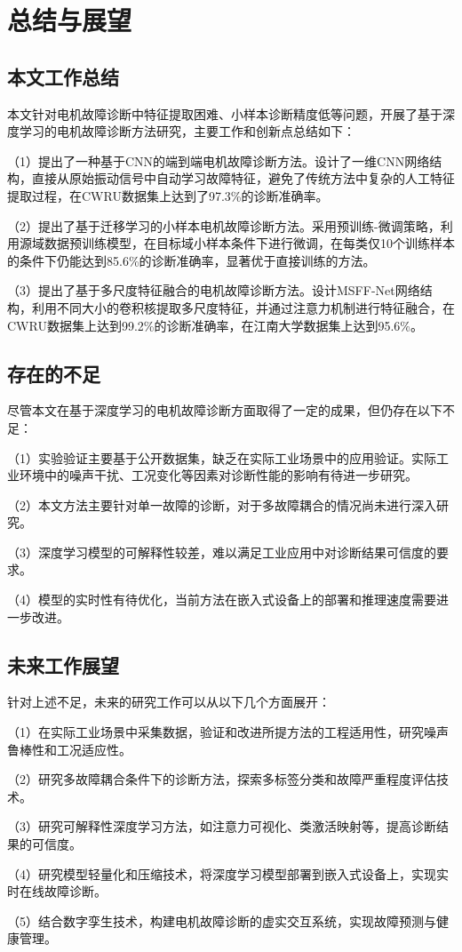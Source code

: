 \chapter{总结与展望}

\section{本文工作总结}

本文针对电机故障诊断中特征提取困难、小样本诊断精度低等问题，开展了基于深度学习的电机故障诊断方法研究，主要工作和创新点总结如下：

（1）提出了一种基于CNN的端到端电机故障诊断方法。设计了一维CNN网络结构，直接从原始振动信号中自动学习故障特征，避免了传统方法中复杂的人工特征提取过程，在CWRU数据集上达到了97.3\%的诊断准确率。

（2）提出了基于迁移学习的小样本电机故障诊断方法。采用预训练-微调策略，利用源域数据预训练模型，在目标域小样本条件下进行微调，在每类仅10个训练样本的条件下仍能达到85.6\%的诊断准确率，显著优于直接训练的方法。

（3）提出了基于多尺度特征融合的电机故障诊断方法。设计MSFF-Net网络结构，利用不同大小的卷积核提取多尺度特征，并通过注意力机制进行特征融合，在CWRU数据集上达到99.2\%的诊断准确率，在江南大学数据集上达到95.6\%。

\section{存在的不足}

尽管本文在基于深度学习的电机故障诊断方面取得了一定的成果，但仍存在以下不足：

（1）实验验证主要基于公开数据集，缺乏在实际工业场景中的应用验证。实际工业环境中的噪声干扰、工况变化等因素对诊断性能的影响有待进一步研究。

（2）本文方法主要针对单一故障的诊断，对于多故障耦合的情况尚未进行深入研究。

（3）深度学习模型的可解释性较差，难以满足工业应用中对诊断结果可信度的要求。

（4）模型的实时性有待优化，当前方法在嵌入式设备上的部署和推理速度需要进一步改进。

\section{未来工作展望}

针对上述不足，未来的研究工作可以从以下几个方面展开：

（1）在实际工业场景中采集数据，验证和改进所提方法的工程适用性，研究噪声鲁棒性和工况适应性。

（2）研究多故障耦合条件下的诊断方法，探索多标签分类和故障严重程度评估技术。

（3）研究可解释性深度学习方法，如注意力可视化、类激活映射等，提高诊断结果的可信度。

（4）研究模型轻量化和压缩技术，将深度学习模型部署到嵌入式设备上，实现实时在线故障诊断。

（5）结合数字孪生技术，构建电机故障诊断的虚实交互系统，实现故障预测与健康管理。